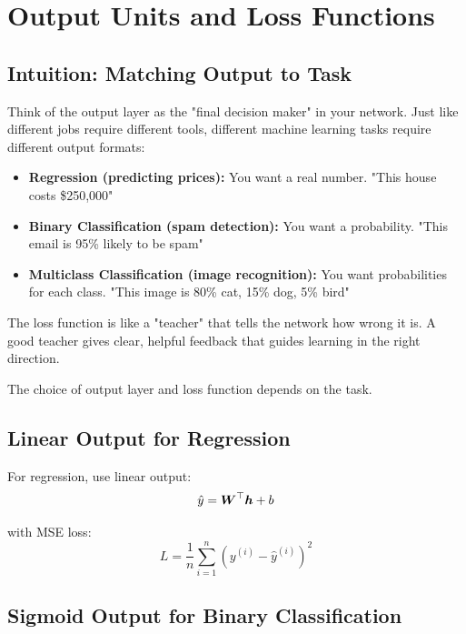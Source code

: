 
\section{Output Units and Loss Functions}
\label{sec:output-loss}

\subsection{Intuition: Matching Output to Task}

Think of the output layer as the "final decision maker" in your network. Just like different jobs require different tools, different machine learning tasks require different output formats:

\begin{itemize}
    \item \textbf{Regression (predicting prices):} You want a real number. "This house costs \$250,000"
    \item \textbf{Binary Classification (spam detection):} You want a probability. "This email is 95\% likely to be spam"
    \item \textbf{Multiclass Classification (image recognition):} You want probabilities for each class. "This image is 80\% cat, 15\% dog, 5\% bird"
\end{itemize}

The loss function is like a "teacher" that tells the network how wrong it is. A good teacher gives clear, helpful feedback that guides learning in the right direction.

The choice of output layer and loss function depends on the task.

\subsection{Linear Output for Regression}

For regression, use linear output:
\begin{equation}
\hat{y} = \boldsymbol{W}^\top \boldsymbol{h} + b
\end{equation}

with MSE loss:
\begin{equation}
L = \frac{1}{n} \sum_{i=1}^{n} (y^{(i)} - \hat{y}^{(i)})^2
\end{equation}

\subsection{Sigmoid Output for Binary Classification}

